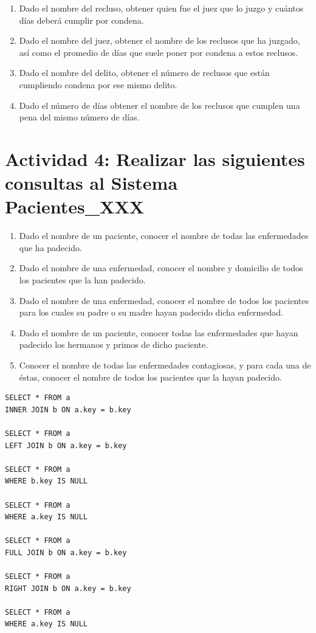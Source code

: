 \documentclass{article}
\begin{document}
\begin{enumerate}
    \item[i.] Dado el nombre del recluso, obtener quien fue el juez que lo juzgo y cuántos días deberá cumplir por condena.
    
    \item[ii.] Dado el nombre del juez, obtener el nombre de los reclusos que ha juzgado, así como el promedio de días que suele poner por condena a estos reclusos.
    
    \item[iii.] Dado el nombre del delito, obtener el número de reclusos que están cumpliendo condena por ese mismo delito.
    
    \item[iv.] Dado el número de días obtener el nombre de los reclusos que cumplen una pena del mismo número de días.
\end{enumerate}


\section*{Actividad 4: Realizar las siguientes consultas al Sistema Pacientes\_XXX}

\begin{enumerate}
    \item[i.] Dado el nombre de un paciente, conocer el nombre de todas las enfermedades que ha padecido.
    
    \item[ii.] Dado el nombre de una enfermedad, conocer el nombre y domicilio de todos los pacientes que la han padecido.
    
    \item[iii.] Dado el nombre de una enfermedad, conocer el nombre de todos los pacientes para los cuales su padre o su madre hayan padecido dicha enfermedad.
    
    \item[iv.] Dado el nombre de un paciente, conocer todas las enfermedades que hayan padecido los hermanos y primos de dicho paciente.
    
    \item[v.] Conocer el nombre de todas las enfermedades contagiosas, y para cada una de éstas, conocer el nombre de todos los pacientes que la hayan padecido.
\end{enumerate}

\begin{verbatim}
SELECT * FROM a
INNER JOIN b ON a.key = b.key

SELECT * FROM a
LEFT JOIN b ON a.key = b.key

SELECT * FROM a
WHERE b.key IS NULL

SELECT * FROM a
WHERE a.key IS NULL

SELECT * FROM a
FULL JOIN b ON a.key = b.key

SELECT * FROM a
RIGHT JOIN b ON a.key = b.key

SELECT * FROM a
WHERE a.key IS NULL
\end{verbatim}
\end{document}
